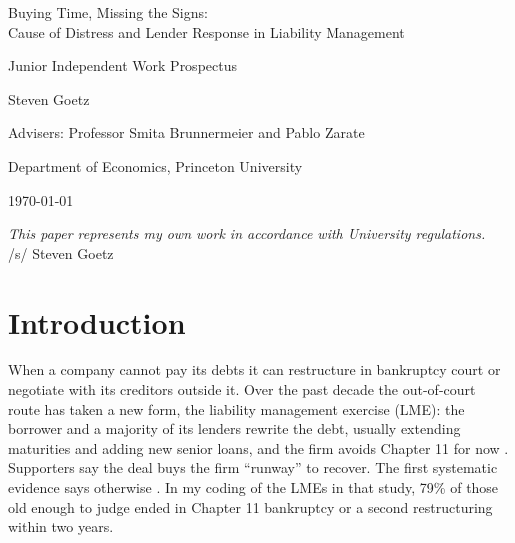 \documentclass[12pt]{article}
\begin{document}
\begin{titlepage}
\centering
\vspace*{1.6in}
{\LARGE Buying Time, Missing the Signs:\\[6pt] Cause of Distress and Lender Response in Liability Management\par}
\vspace{0.6in}
{\large Junior Independent Work Prospectus\par}
\vspace{0.6in}
{\large Steven Goetz\par}
\vspace{0.15in}
{\large Advisers: Professor Smita Brunnermeier and Pablo Zarate\par}
\vspace{0.15in}
{\large Department of Economics, Princeton University\par}
\vspace{0.15in}
{\large \today\par}
\vfill
\begin{minipage}{0.85\textwidth}
\centering
\emph{This paper represents my own work in accordance with University regulations.}\\[10pt]
/s/ Steven Goetz
\end{minipage}
\vspace{0.8in}
\end{titlepage}

\setcounter{page}{1}
\doublespacing

\section{Introduction}

When a company cannot pay its debts it can restructure in bankruptcy court or negotiate with its creditors outside it. Over the past decade the out-of-court route has taken a new form, the liability management exercise (LME): the borrower and a majority of its lenders rewrite the debt, usually extending maturities and adding new senior loans, and the firm avoids Chapter 11 for now \citep{buccolanini2024}. Supporters say the deal buys the firm ``runway'' to recover. The first systematic evidence says otherwise \citep{roerotaru2026}. In my coding of the LMEs in that study, 79\% of those old enough to judge ended in Chapter 11 bankruptcy or a second restructuring within two years.
\end{document}
